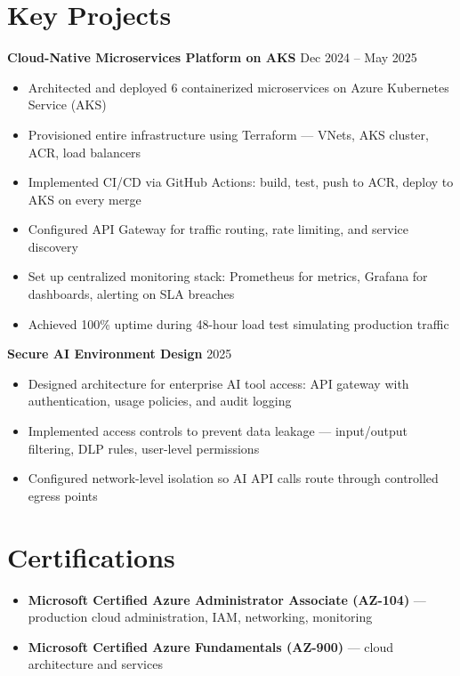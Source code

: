 \documentclass[a4paper,10pt]{article}
\begin{document}
\section{Key Projects}

\textbf{Cloud-Native Microservices Platform on AKS} \hfill Dec 2024 -- May 2025 \\
\begin{itemize}
    \item Architected and deployed 6 containerized microservices on Azure Kubernetes Service (AKS)
    \item Provisioned entire infrastructure using Terraform — VNets, AKS cluster, ACR, load balancers
    \item Implemented CI/CD via GitHub Actions: build, test, push to ACR, deploy to AKS on every merge
    \item Configured API Gateway for traffic routing, rate limiting, and service discovery
    \item Set up centralized monitoring stack: Prometheus for metrics, Grafana for dashboards, alerting on SLA breaches
    \item Achieved 100\% uptime during 48-hour load test simulating production traffic
\end{itemize}

\vspace{6pt}
\textbf{Secure AI Environment Design} \hfill 2025 \\
\begin{itemize}
    \item Designed architecture for enterprise AI tool access: API gateway with authentication, usage policies, and audit logging
    \item Implemented access controls to prevent data leakage — input/output filtering, DLP rules, user-level permissions
    \item Configured network-level isolation so AI API calls route through controlled egress points
\end{itemize}

\section{Certifications}
\begin{itemize}
    \item \textbf{Microsoft Certified Azure Administrator Associate (AZ-104)} — production cloud administration, IAM, networking, monitoring
    \item \textbf{Microsoft Certified Azure Fundamentals (AZ-900)} — cloud architecture and services
\end{itemize}
\end{document}
